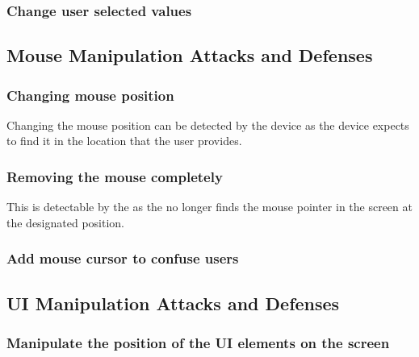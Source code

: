 \subsubsection{Change user selected values}


\subsection{Mouse Manipulation Attacks and Defenses}
\subsubsection{Changing mouse position}
Changing the mouse position can be detected by the device as the device expects to find it in the location that the user provides. 
\subsubsection{Removing the mouse completely}
This is detectable by the \device as the \device no longer finds the mouse pointer in the screen at the designated position.  
\subsubsection{Add mouse cursor to confuse users}

\subsection{UI Manipulation Attacks and Defenses}
\subsubsection{Manipulate the position of the UI elements on the screen}
\fi